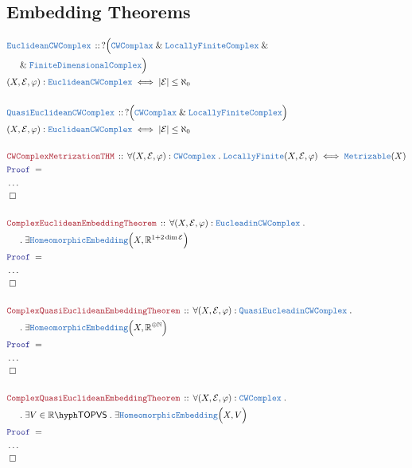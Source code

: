 \documentclass[12pt]{scrartcl}
\newcommand{\TYPE}[1]{\textcolor{NavyBlue}{\mathtt{#1}}}
\newcommand{\LOGIC}[1]{\textcolor{Blue}{\mathtt{#1}}}
\newcommand{\THM}[1]{\textcolor{Maroon}{\mathtt{#1}}}
\renewcommand{\.}{\; . \;}
\newcommand{\Theorem}[2]{& \THM{#1} \, :: \, #2 \\ & \Proof = \\ }
\newcommand{\DeclareType}[2]{& \TYPE{#1} \, :: \, #2 \\}
\newcommand{\DefineType}[3]{& #1 : \TYPE{#2} \iff #3 \\}
\newcommand{\NewLine}{\\ & \kern 1pc}
\newcommand{\Page}[1]{ \begin{align*} #1 \end{align*}   }
\newcommand{\NoProof}{ & \ldots \\ \EndProof}
\renewcommand{\And}{\; \& \;}
\newcommand{\Reals}{\mathbb{R} }
\newcommand{\Nat}{\mathbb{N} }
\newcommand{\QED}{\; \square}
\newcommand{\EndProof}{& \QED \\}
\newcommand{\Proof}{\LOGIC{Proof} \; }
\newcommand{\E}{\mathcal{E}}
\begin{document}
\subsection{Embedding Theorems}
\Page{
	\DeclareType{EuclideanCWComplex}
	{
		?\Big(\TYPE{CWComplax} \And \TYPE{LocallyFiniteComplex} \And \NewLine \And
		\TYPE{FiniteDimensionalComplex} \Big)
	}
	\DefineType{(X,\E,\varphi)}{EuclideanCWComplex}{ |\E| \le \aleph_0  }
	\\
	\DeclareType{QuasiEuclideanCWComplex}
	{
		?\Big(\TYPE{CWComplax} \And \TYPE{LocallyFiniteComplex}  \Big)
	}
	\DefineType{(X,\E,\varphi)}{EuclideanCWComplex}{ |\E| \le \aleph_0  }
	\\	
	\Theorem{CWComplexMetrizationTHM}
	{
		\forall (X,\E,\varphi) : \TYPE{CWComplex} \.
		\TYPE{LocallyFinite}(X,\E,\varphi)
		\iff
		\TYPE{Metrizable}(X)
	}
	\NoProof
	\\
	\Theorem{ComplexEuclideanEmbeddingTheorem}
	{
		\forall (X,\E,\varphi) :
		\TYPE{EucleadinCWComplex} \. \NewLine \.
		\exists \TYPE{HomeomorphicEmbedding}\Big(X, \Reals^{1 + 2\dim \E }\Big)
	}
	\NoProof
	\\
	\Theorem{ComplexQuasiEuclideanEmbeddingTheorem}
	{
		\forall (X,\E,\varphi) :
	\TYPE{QuasiEucleadinCWComplex} \. \NewLine \.
		\exists \TYPE{HomeomorphicEmbedding}\Big(X, \Reals^{\oplus \Nat }\Big)
	}
	\NoProof
	\\
	\Theorem{ComplexQuasiEuclideanEmbeddingTheorem}
	{
		\forall (X,\E,\varphi) :\TYPE{CWComplex} \. \NewLine \.
		\exists V \in \Reals \hyph \mathsf{TOPVS} \.
		\exists \TYPE{HomeomorphicEmbedding}\Big(X, V\Big)
	}
	\NoProof
}
\newpage
\end{document}
